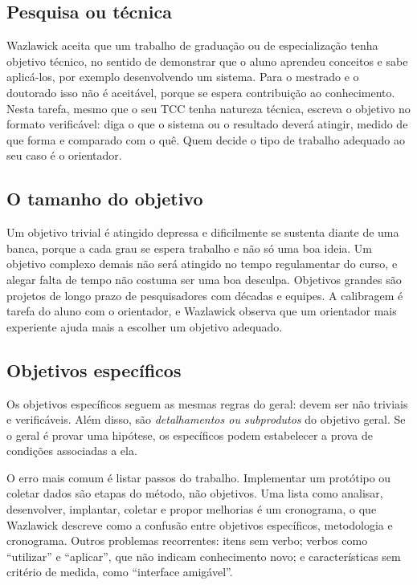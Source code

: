 \documentclass[10pt,a4paper]{extarticle}
\theoremstyle{definition}
\begin{document}
\subsection{Pesquisa ou técnica}

Wazlawick aceita que um trabalho de graduação ou de especialização tenha objetivo técnico, no sentido de demonstrar que o aluno aprendeu conceitos e sabe aplicá-los, por exemplo desenvolvendo um sistema. Para o mestrado e o doutorado isso não é aceitável, porque se espera contribuição ao conhecimento. Nesta tarefa, mesmo que o seu TCC tenha natureza técnica, escreva o objetivo no formato verificável: diga o que o sistema ou o resultado deverá atingir, medido de que forma e comparado com o quê. Quem decide o tipo de trabalho adequado ao seu caso é o orientador.

\subsection{O tamanho do objetivo}

Um objetivo trivial é atingido depressa e dificilmente se sustenta diante de uma banca, porque a cada grau se espera trabalho e não só uma boa ideia. Um objetivo complexo demais não será atingido no tempo regulamentar do curso, e alegar falta de tempo não costuma ser uma boa desculpa. Objetivos grandes são projetos de longo prazo de pesquisadores com décadas e equipes. A calibragem é tarefa do aluno com o orientador, e Wazlawick observa que um orientador mais experiente ajuda mais a escolher um objetivo adequado.

\subsection{Objetivos específicos}

Os objetivos específicos seguem as mesmas regras do geral: devem ser não triviais e verificáveis. Além disso, são \emph{detalhamentos ou subprodutos} do objetivo geral. Se o geral é provar uma hipótese, os específicos podem estabelecer a prova de condições associadas a ela.

O erro mais comum é listar passos do trabalho. Implementar um protótipo ou coletar dados são etapas do método, não objetivos. Uma lista como analisar, desenvolver, implantar, coletar e propor melhorias é um cronograma, o que Wazlawick descreve como a confusão entre objetivos específicos, metodologia e cronograma. Outros problemas recorrentes: itens sem verbo; verbos como \enquote{utilizar} e \enquote{aplicar}, que não indicam conhecimento novo; e características sem critério de medida, como \enquote{interface amigável}.
\end{document}
